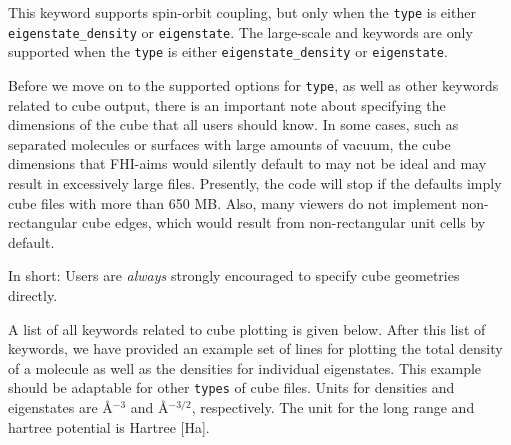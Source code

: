 This keyword supports spin-orbit coupling, but only when the \texttt{type} is
either \texttt{eigenstate\_density} or \texttt{eigenstate}.  The large-scale
 and  keywords
are only supported when the \texttt{type} is either \texttt{eigenstate\_density}
or \texttt{eigenstate}.


Before we move on to the supported options for \texttt{type}, as well as
other keywords related to cube output, there is an important note about
specifying the dimensions of the cube that all users should know.  In some
cases, such as separated molecules or surfaces with large amounts of vacuum,
the cube dimensions that FHI-aims would silently default to may not be ideal
and may result in excessively large files.  Presently, the code will stop if
the defaults imply cube files with more than 650 MB. Also, many viewers do not
implement non-rectangular cube edges, which would result from non-rectangular
unit cells by default.

In short: Users are \emph{always} strongly encouraged to specify cube
geometries directly.

A list of all keywords related to cube plotting is given below.  After this
list of keywords, we have provided an example set of lines for plotting the
total density of a molecule as well as the densities for individual eigenstates.
This example should be adaptable for other \texttt{types} of cube files.
Units for densities and eigenstates are {\AA}$^{-3}$ and {\AA}$^{-3/2}$, respectively.
The unit for the long range and hartree potential is Hartree [Ha].

